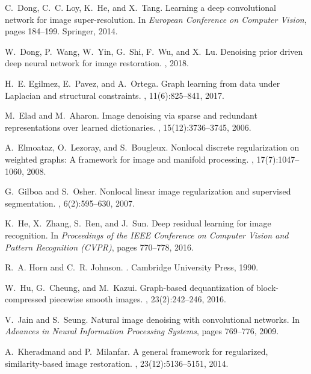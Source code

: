 \documentclass[10pt,twocolumn,letterpaper]{article}
\begin{document}
{\begin{thebibliography}{10}
C.~Dong, C.~C. Loy, K.~He, and X.~Tang.
\newblock Learning a deep convolutional network for image super-resolution.
\newblock In {\em European Conference on Computer Vision}, pages 184--199.
  Springer, 2014.

W.~Dong, P.~Wang, W.~Yin, G.~Shi, F.~Wu, and X.~Lu.
\newblock Denoising prior driven deep neural network for image restoration.
, 2018.

H.~E. Egilmez, E.~Pavez, and A.~Ortega.
\newblock Graph learning from data under {L}aplacian and structural
  constraints.
,
  11(6):825--841, 2017.

M.~Elad and M.~Aharon.
\newblock Image denoising via sparse and redundant representations over learned
  dictionaries.
, 15(12):3736--3745, 2006.

A.~Elmoataz, O.~Lezoray, and S.~Bougleux.
\newblock Nonlocal discrete regularization on weighted graphs: {A} framework
  for image and manifold processing.
, 17(7):1047--1060, 2008.

G.~Gilboa and S.~Osher.
\newblock Nonlocal linear image regularization and supervised segmentation.
, 6(2):595--630, 2007.

K.~He, X.~Zhang, S.~Ren, and J.~Sun.
\newblock Deep residual learning for image recognition.
\newblock In {\em Proceedings of the IEEE Conference on Computer Vision and
  Pattern Recognition (CVPR)}, pages 770--778, 2016.

R.~A. Horn and C.~R. Johnson.
.
\newblock Cambridge University Press, 1990.

W.~Hu, G.~Cheung, and M.~Kazui.
\newblock Graph-based dequantization of block-compressed piecewise smooth
  images.
, 23(2):242--246, 2016.

V.~Jain and S.~Seung.
\newblock Natural image denoising with convolutional networks.
\newblock In {\em Advances in Neural Information Processing Systems}, pages
  769--776, 2009.

A.~Kheradmand and P.~Milanfar.
\newblock A general framework for regularized, similarity-based image
  restoration.
, 23(12):5136--5151, 2014.


\end{thebibliography}}
\end{document}
